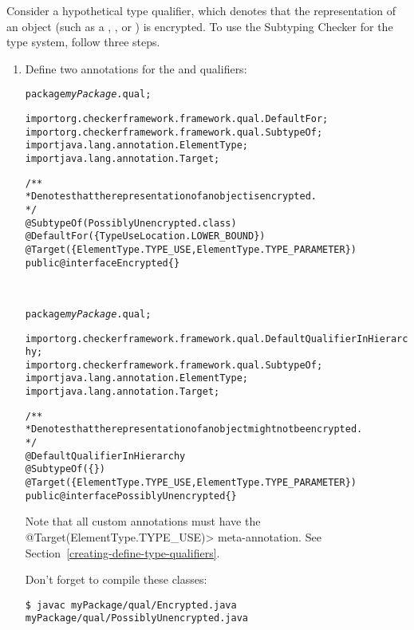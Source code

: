 
Consider a hypothetical  type qualifier, which denotes that the
representation of an object (such as a , , or
) is encrypted. To use the Subtyping Checker for the 
type system, follow three steps.

\begin{enumerate}
\item
Define two annotations for the  and  qualifiers:

\begin{alltt}
package \textit{myPackage}.qual;

import org.checkerframework.framework.qual.DefaultFor;
import org.checkerframework.framework.qual.SubtypeOf;
import java.lang.annotation.ElementType;
import java.lang.annotation.Target;

/**
 * Denotes that the representation of an object is encrypted.
 */
@SubtypeOf(PossiblyUnencrypted.class)
@DefaultFor(\{TypeUseLocation.LOWER_BOUND\})
@Target(\{ElementType.TYPE_USE, ElementType.TYPE_PARAMETER\})
public @interface Encrypted \{\}
\end{alltt}

~

\begin{alltt}
package \textit{myPackage}.qual;

import org.checkerframework.framework.qual.DefaultQualifierInHierarchy;
import org.checkerframework.framework.qual.SubtypeOf;
import java.lang.annotation.ElementType;
import java.lang.annotation.Target;

/**
 * Denotes that the representation of an object might not be encrypted.
 */
@DefaultQualifierInHierarchy
@SubtypeOf(\{\})
@Target(\{ElementType.TYPE_USE, ElementType.TYPE_PARAMETER\})
public @interface PossiblyUnencrypted \{\}
\end{alltt}

Note that all custom annotations must have the
\<@Target(ElementType.TYPE\_USE)> meta-annotation.
See Section~\ref{creating-define-type-qualifiers}.

Don't forget to compile these classes:

\begin{Verbatim}
$ javac myPackage/qual/Encrypted.java myPackage/qual/PossiblyUnencrypted.java
\end{Verbatim}


\end{enumerate}
